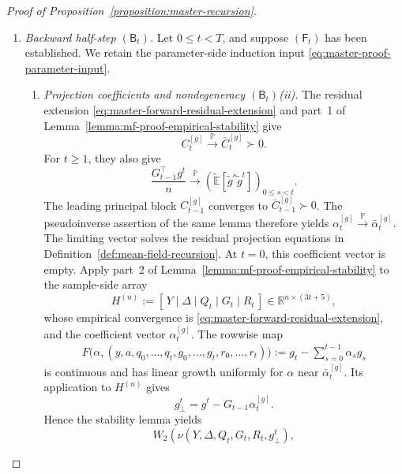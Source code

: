\begin{proof}[Proof of Proposition~\ref{proposition:master-recursion}]
\begin{enumerate}[wide]
    \item \emph{Backward half-step $(\mathsf B_t)$.}
    Let $0\leq t<T$, and suppose $(\mathsf F_t)$ has been
    established. We retain the parameter-side induction input
    \eqref{eq:master-proof-parameter-input}.
    \begin{enumerate}[label=(\alph*),wide]
        \item \emph{Projection coefficients and nondegeneracy
        $(\mathsf B_t)$\textup{(ii)}.}
        The residual extension
        \eqref{eq:master-forward-residual-extension}
        and part~1 of
        Lemma~\ref{lemma:mf-proof-empirical-stability}
        give
        \[
            C_t^{[g]}
            \xrightarrow{\mathbb P}\bar C_t^{[g]}\succ0.
        \]
        For $t\geq1$, they also give
        \[
            \frac{G_{t-1}^\top g^t}{n}
            \xrightarrow{\mathbb P}
            \left(
                \tilde{\mathbb E}[\tilde g^s\tilde g^t]
            \right)_{0\leq s<t}.
        \]
        The leading principal block $C_{t-1}^{[g]}$
        converges to $\bar C_{t-1}^{[g]}\succ0$.
        The pseudoinverse assertion of the same lemma
        therefore yields
        \(
            \alpha_t^{[g]}
            \xrightarrow{\mathbb P}\bar\alpha_t^{[g]}
        \).
        The limiting vector solves the residual projection
        equations in
        Definition~\ref{def:mean-field-recursion}.
        At $t=0$, this coefficient vector is empty.
        Apply part~2 of
        Lemma~\ref{lemma:mf-proof-empirical-stability}
        to the sample-side array
        \[
            H^{(n)}
            :=
            [\,Y\mid\Delta\mid Q_t\mid G_t\mid R_t\,]
            \in\mathbb R^{n\times(3t+5)},
        \]
        whose empirical convergence is
        \eqref{eq:master-forward-residual-extension},
        and the coefficient vector $\alpha_t^{[g]}$.
        The rowwise map
        \[
        \begin{aligned}
            F\bigl(
                \alpha,
                (y,a,q_0,\ldots,q_t,
                    g_0,\ldots,g_t,r_0,\ldots,r_t)
            \bigr)
            :=
            g_t-\sum_{s=0}^{t-1}\alpha_s g_s
        \end{aligned}
        \]
        is continuous and has linear growth uniformly for
        $\alpha$ near $\bar\alpha_t^{[g]}$.
        Its application to $H^{(n)}$ gives
        \[
            g_\perp^t=g^t-G_{t-1}\alpha_t^{[g]}.
        \]
        Hence the stability lemma yields
        \[
            W_2\left(
                \nu(Y,\Delta,Q_t,G_t,R_t,g_\perp^t),
\]
\end{enumerate}
\end{enumerate}
\end{proof}
